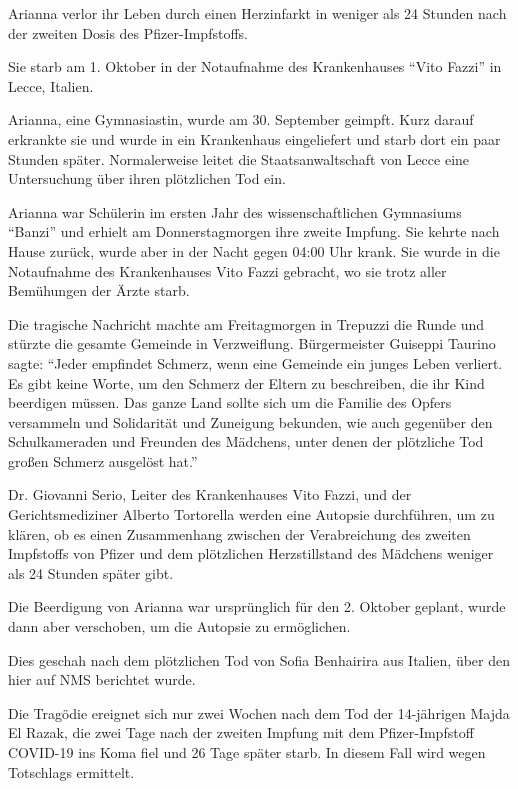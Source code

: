 Arianna verlor ihr Leben durch einen Herzinfarkt in weniger als 24 Stunden nach
der zweiten Dosis des Pfizer-Impfstoffs.

Sie starb am 1. Oktober in der Notaufnahme des Krankenhauses “Vito Fazzi” in
Lecce, Italien.

Arianna, eine Gymnasiastin, wurde am 30. September geimpft. Kurz darauf
erkrankte sie und wurde in ein Krankenhaus eingeliefert und starb dort ein paar
Stunden später. Normalerweise leitet die Staatsanwaltschaft von Lecce eine
Untersuchung über ihren plötzlichen Tod ein.

Arianna war Schülerin im ersten Jahr des wissenschaftlichen Gymnasiums “Banzi”
und erhielt am Donnerstagmorgen ihre zweite Impfung. Sie kehrte nach Hause
zurück, wurde aber in der Nacht gegen 04:00 Uhr krank. Sie wurde in die
Notaufnahme des Krankenhauses Vito Fazzi gebracht, wo sie trotz aller Bemühungen
der Ärzte starb.

Die tragische Nachricht machte am Freitagmorgen in Trepuzzi die Runde und
stürzte die gesamte Gemeinde in Verzweiflung. Bürgermeister Guiseppi Taurino
sagte: “Jeder empfindet Schmerz, wenn eine Gemeinde ein junges Leben
verliert. Es gibt keine Worte, um den Schmerz der Eltern zu beschreiben, die ihr
Kind beerdigen müssen. Das ganze Land sollte sich um die Familie des Opfers
versammeln und Solidarität und Zuneigung bekunden, wie auch gegenüber den
Schulkameraden und Freunden des Mädchens, unter denen der plötzliche Tod großen
Schmerz ausgelöst hat.”

Dr. Giovanni Serio, Leiter des Krankenhauses Vito Fazzi, und der
Gerichtsmediziner Alberto Tortorella werden eine Autopsie durchführen, um zu
klären, ob es einen Zusammenhang zwischen der Verabreichung des zweiten
Impfstoffs von Pfizer und dem plötzlichen Herzstillstand des Mädchens weniger
als 24 Stunden später gibt.

Die Beerdigung von Arianna war ursprünglich für den 2. Oktober geplant, wurde
dann aber verschoben, um die Autopsie zu ermöglichen.

Dies geschah nach dem plötzlichen Tod von Sofia Benhairira aus Italien, über den
hier auf NMS berichtet wurde.

Die Tragödie ereignet sich nur zwei Wochen nach dem Tod der 14-jährigen Majda El
Razak, die zwei Tage nach der zweiten Impfung mit dem Pfizer-Impfstoff COVID-19
ins Koma fiel und 26 Tage später starb. In diesem Fall wird wegen Totschlags
ermittelt.
